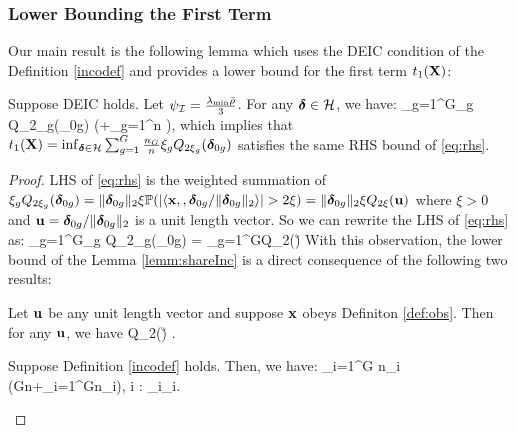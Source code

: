 \subsubsection{Lower Bounding the First Term}
Our main result is the following lemma which uses the DEIC condition of the Definition \ref{incodef} and provides a lower bound for the first term $t_1(\mathbf{X})$:
\begin{lemma}
	\label{lemm:shareInc} 
	Suppose DEIC holds. Let $\psi_{{\cal{I}}}=\frac{\lambda_{\min}\bar{\rho}}{3}$. For any $\boldsymbol{\delta} \in {\cal H}$, we have: %
	\be 
	\label{eq:rhs}
	\sum_{g=1}^G\xi_g Q_{2\xi_g}(\ddelta_{0g}) \geq \rinc\xi {}\left(+\sum_{g=1}^n \right),
	\ee 	
	which implies that $t_1(\mathbf{X})=\inf_{\boldsymbol{\delta}\in {\cal H}} \sum_{g=1}^G\frac{n_G}{n}\xi_g Q_{2\xi_g}(\boldsymbol{\delta}_{0g})$ satisfies the same RHS bound of \eqref{eq:rhs}.
\end{lemma}
\begin{proof}
	LHS of \eqref{eq:rhs} is the weighted summation of $\xi_g Q_{2\xi_g}(\boldsymbol{\delta}_{0g}) = \|\boldsymbol{\delta}_{0g}\|_{2}\xi \mathbb{P}(|\langle \mathbf{x}, , \boldsymbol{\delta}_{0g}/\|\boldsymbol{\delta}_{0g}\|_{2} \rangle| > 2\xi) = \|\boldsymbol{\delta}_{0g}\|_{2}\xi Q_{2\xi}(\mathbf{u})$ where $\xi > 0$ and $\mathbf{u} = \boldsymbol{\delta}_{0g}/\|\boldsymbol{\delta}_{0g}\|_{2}$ is a unit length vector. 
	So we can rewrite the LHS of \eqref{eq:rhs} as:
	\be 
	\nr 
	\sum_{g=1}^G\xi_g Q_{2\xi_g}(\ddelta_{0g}) = \sum_{g=1}^G\xi Q_{2\xi}(\u)
	\ee 
	With this observation, the lower bound of the Lemma \ref{lemm:shareInc} is a direct consequence of the following two results: 
	\begin{lemma}\label{paley} Let $\mathbf{u}$ be any unit length vector and suppose $\mathbf{x}$ obeys Definiton \ref{def:obs}. Then for any $\mathbf{u}$, we have
		\be 
		Q_{2\xi}(\u) \geq {}.
		\ee 	
	\end{lemma}
	\begin{lemma} \label{incolem main} Suppose Definition \ref{incodef} holds. Then, we have: 
		\be 
		\sum_{i=1}^G n_i\geq{} \left(Gn+\sum_{i=1}^Gn_i\right), \quad \forall i \in [G]: \ddelta_i\in \cC_i.
		\ee 
	\end{lemma}	
\end{proof}

